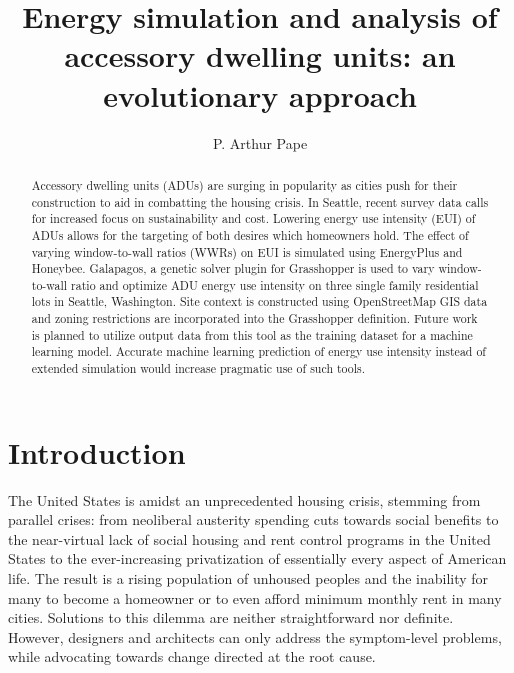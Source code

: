 \documentclass[sagev,times,Royal]{sagej}
\begin{document}

\title{Energy simulation and analysis of accessory dwelling units: 
an evolutionary approach}

\author{P. Arthur Pape}




\begin{abstract}
Accessory dwelling units (ADUs) are surging in popularity as cities push for their construction to aid in combatting the housing crisis. In Seattle, recent survey data calls for increased focus on sustainability and cost. Lowering energy use intensity (EUI) of ADUs allows for the targeting of both desires which homeowners hold. The effect of varying window-to-wall ratios (WWRs) on EUI is simulated using EnergyPlus and Honeybee. Galapagos, a genetic solver plugin for Grasshopper is used to vary window-to-wall ratio and optimize ADU energy use intensity on three single family residential lots in Seattle, Washington. Site context is constructed using OpenStreetMap GIS data and zoning restrictions are incorporated into the Grasshopper definition. Future work is planned to utilize output data from this tool as the training dataset for a machine learning model. Accurate machine learning prediction of energy use intensity instead of extended simulation would increase pragmatic use of such tools.
\end{abstract}


\maketitle


\section{Introduction}
The United States is amidst an unprecedented housing crisis, stemming from parallel crises: from neoliberal austerity spending cuts towards social benefits to the near-virtual lack of social housing and rent control programs in the United States to the ever-increasing privatization of essentially every aspect of American life\cite{10.2307/26297969}. The result is a rising population of unhoused peoples and the inability for many to become a homeowner or to even afford minimum monthly rent in many cities. Solutions to this dilemma are neither straightforward nor definite. However, designers and architects can only address the symptom-level problems, while advocating towards change directed at the root cause. 
\end{document}
